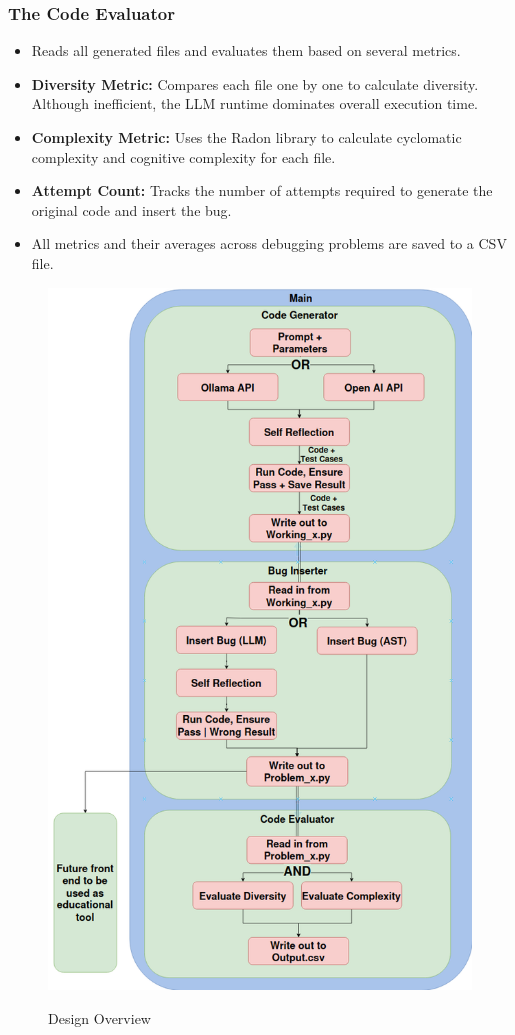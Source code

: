 \documentclass[12pt]{extarticle}
\begin{document}
\subsubsection{The Code Evaluator}
\begin{itemize}
    \item Reads all generated files and evaluates them based on several metrics.
    \item \textbf{Diversity Metric:} Compares each file one by one to calculate diversity. Although inefficient, the LLM runtime dominates overall execution time.
    \item \textbf{Complexity Metric:} Uses the Radon library to calculate cyclomatic complexity and cognitive complexity for each file.
    \item \textbf{Attempt Count:} Tracks the number of attempts required to generate the original code and insert the bug.
    \item All metrics and their averages across debugging problems are saved to a CSV file.
\end{itemize}

\begin{figure}[htbp]
\centering
\includegraphics[width=0.7\linewidth]{Images/Tall_Design.png}
\label{fig:tall_design}
\caption{Design Overview}
\end{figure}
\end{document}
